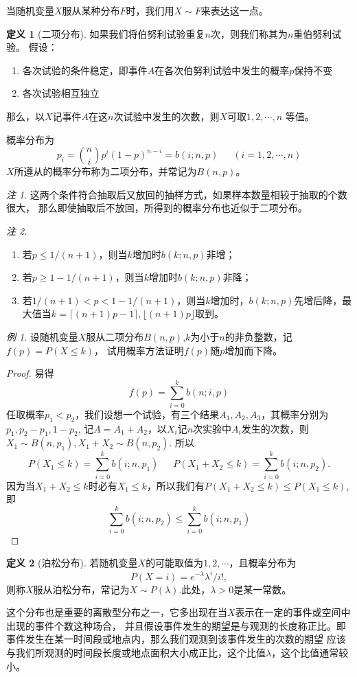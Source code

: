 \documentclass[a4paper,11pt]{article}%
\theoremstyle{remark}
\newtheorem*{remark}{注}
\theoremstyle{remark}
\newtheorem*{example}{例}
\theoremstyle{definition}
\theoremstyle{definition}
\newtheorem*{definition}{定义}
\theoremstyle{plain}
\begin{document}
当随机变量$X$服从某种分布$F$时，我们用$X\sim F$来表达这一点。
\begin{definition}[二项分布]
    如果我们将伯努利试验重复$n$次，则我们称其为$n$重伯努利试验。
    假设：
    \begin{enumerate}
        \item 各次试验的条件稳定，即事件$A$在各次伯努利试验中发生的概率$p$保持不变
        \item 各次试验相互独立
    \end{enumerate}
    那么，以$X$记事件$A$在这$n$次试验中发生的次数，则$X$可取$1,2,\cdots,n$
    等值。 

    概率分布为
    \[p_i=\binom{n}{i}p^i(1-p)^{n-i}=b(i;n,p)\phantom{111}(i=1,2,\cdots,n)\]$X$所遵从的概率分布称为二项分布，并常记为$B(n,p)$。
\end{definition}
\begin{remark}
    这两个条件符合抽取后又放回的抽样方式，如果样本数量相较于抽取的个数很大，
    那么即使抽取后不放回，所得到的概率分布也近似于二项分布。
\end{remark}
\begin{remark}
    \begin{enumerate}
        \item 若$p\leq 1/(n+1)$，则当$k$增加时$b(k;n,p)$非增；
        \item 若$p\geq 1-1/(n+1)$，则当$k$增加时$b(k;n,p)$非降；
        \item 若$1/(n+1)<p<1-1/(n+1)$，则当$k$增加时，$b(k;n,p)$先增后降，最大值当$k=\lceil(n+1)p-1\rceil,\lfloor(n+1)p\rfloor$取到。
    \end{enumerate}
\end{remark}
\begin{example}
    设随机变量$X$服从二项分布$B(n,p)$,$k$为小于$n$的非负整数，记$f(p)=P(X\leq k)$，
    试用概率方法证明$f(p)$随$p$增加而下降。

    \begin{proof}
        易得
        \[f(p)=\sum_{i=0}^kb(n;i,p)\]
        任取概率$p_1<p_2$，我们设想一个试验，有三个结果$A_1,A_2,A_3$，其概率分别为$p_1,p_2-p_1,1-p_2$,
        记$A=A_1+A_2$，以$X_i$记$n$次实验中$A_i$发生的次数，则$X_1\sim B(n,p_1),X_1+X_2\sim B(n,p_2)$.
        所以 
        \[P(X_1\leq k)=\sum_{i=0}^kb(i;n,p_1)\phantom{111}P(X_1+X_2\leq k)=\sum_{i=0}^kb(i;n,p_2).\]
        因为当$X_1+X_2\leq k$时必有$X_1\leq k$，所以我们有$P(X_1+X_2\leq k)\leq P(X_1\leq k)$,即
        \[\sum_{i=0}^kb(i;n,p_2)\leq \sum_{i=0}^kb(i;n,p_1)\]
    \end{proof}
\end{example}
\begin{definition}[泊松分布]
    若随机变量$X$的可能取值为$1,2,\cdots$，且概率分布为
    \[P(X=i)=e^{-\lambda}\lambda^i/i!,\]
    则称$X$服从泊松分布，常记为$X\sim P(\lambda)$.此处，$\lambda>0$是某一常数。
\end{definition}
这个分布也是重要的离散型分布之一，它多出现在当$X$表示在一定的事件或空间中出现的事件个数这种场合，
并且假设事件发生的期望是与观测的长度称正比。即事件发生在某一时间段或地点内，那么我们观测到该事件发生的次数的期望
应该与我们所观测的时间段长度或地点面积大小成正比，这个比值$\lambda$，这个比值通常较小。
\end{document}
